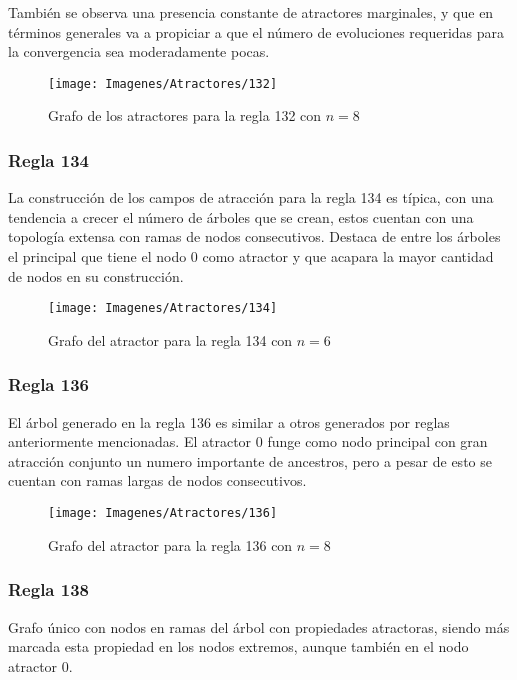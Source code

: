 \documentclass[]{article}
\begin{document}
				\hfill\break
				\justifying
				También se observa una presencia constante de atractores marginales, y que en términos generales va a propiciar a que el número de evoluciones requeridas para la convergencia sea moderadamente pocas.
				
				\hfill\break
				\hfill\break
				\begin{figure}[!h]
					\centering
					\texttt{[image: Imagenes/Atractores/132]}
					\caption{Grafo de los atractores para la regla 132 con $n=8$}
					\label{Regla_132}
				\end{figure}
			
			\newpage
			\subsubsection{Regla 134}
				\justifying
				La construcción de los campos de atracción para la regla 134 es típica, con una tendencia a crecer el número de árboles que se crean, estos cuentan con una topología extensa con ramas de nodos consecutivos. Destaca de entre los árboles el principal que tiene el nodo 0 como atractor y que acapara la mayor cantidad de nodos en su construcción.
				
				\hfill\break
				\hfill\break
				\begin{figure}[!h]
					\centering
					\texttt{[image: Imagenes/Atractores/134]}
					\caption{Grafo del atractor para la regla 134 con $n=6$}
					\label{Regla_134}
				\end{figure}
				
			\newpage
			\subsubsection{Regla 136}
				\justifying
				El árbol generado en la regla 136 es similar a otros generados por reglas anteriormente mencionadas. El atractor 0 funge como nodo principal con gran atracción conjunto un numero importante de ancestros, pero a pesar de esto se cuentan con ramas largas de nodos consecutivos.
				
				\hfill\break
				\hfill\break
				\begin{figure}[!h]
					\centering
					\texttt{[image: Imagenes/Atractores/136]}
					\caption{Grafo del atractor para la regla 136 con $n=8$}
					\label{Regla_136}
				\end{figure}
			
			\newpage
			\subsubsection{Regla 138}
				\justifying
				Grafo único con nodos en ramas del árbol con propiedades atractoras, siendo más marcada esta propiedad en los nodos extremos, aunque también en el nodo atractor 0.
				
\end{document}
